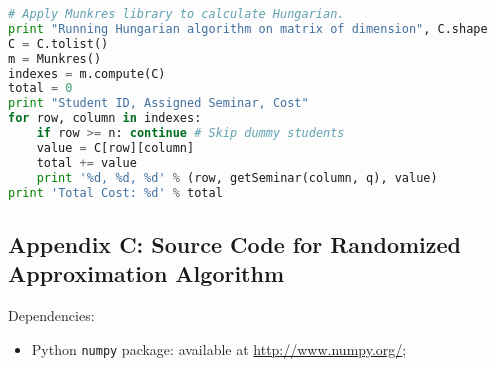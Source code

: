 \documentclass{article} %
\begin{document}
\begin{lstlisting}[language=python]
# Apply Munkres library to calculate Hungarian.
print "Running Hungarian algorithm on matrix of dimension", C.shape
C = C.tolist()
m = Munkres()
indexes = m.compute(C)
total = 0
print "Student ID, Assigned Seminar, Cost"
for row, column in indexes:
    if row >= n: continue # Skip dummy students
    value = C[row][column]
    total += value
    print '%d, %d, %d' % (row, getSeminar(column, q), value)
print 'Total Cost: %d' % total
\end{lstlisting}

\vspace{\fill}
\pagebreak
\subsection*{Appendix C: Source Code for Randomized Approximation Algorithm}
\par Dependencies:
\begin{itemize}
    \item Python \texttt{numpy} package: available at \url{http://www.numpy.org/};
\end{itemize}
\end{document}

